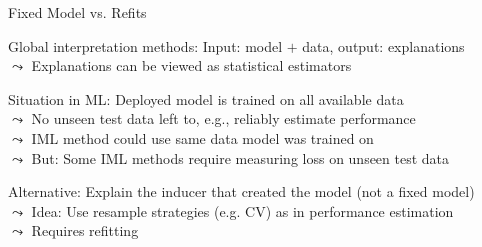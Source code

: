 \documentclass[10pt,compress,t,notes=noshow, xcolor=table]{beamer}
\newcommand{\tab}[1][1cm]{\hspace*{#1}}
\begin{document}



\begin{framev}[align=top]{Fixed Model vs. Refits}
\begin{itemizeM}
\item Global interpretation methods: Input: model $+$ data, output: explanations\\
$\leadsto$ Explanations can be viewed as statistical estimators
\item[] 
\item Situation in ML: Deployed model is trained on all available data\\
$\leadsto$ No unseen test data left to, e.g., reliably estimate performance\\
$\leadsto$ IML method could use same data model was trained on \\
$\leadsto$ But: Some IML methods require measuring loss on unseen test data
\item Alternative: Explain the inducer that created the model (not a fixed model)\\
$\leadsto$ Idea: Use resample strategies (e.g. CV) as in performance estimation\\
$\leadsto$ Requires refitting
\end{itemizeM}
\end{framev}
\end{document}
